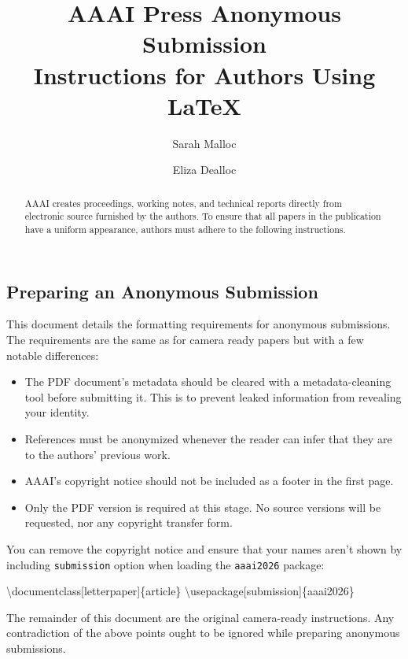\documentclass[letterpaper]{article} %
\title{AAAI Press Anonymous Submission\\
Instructions for Authors Using {\LaTeX}}
\author{Sarah Malloc \and Eliza Dealloc}
\date{}
\newenvironment{Shaded}{\begin{snugshade}}{\end{snugshade}}
\newcommand{\BuiltInTok}[1]{\textcolor[rgb]{0.00,0.23,0.31}{#1}}
\newcommand{\ExtensionTok}[1]{\textcolor[rgb]{0.00,0.23,0.31}{#1}}
\newcommand{\NormalTok}[1]{\textcolor[rgb]{0.00,0.23,0.31}{#1}}
\providecommand{\tightlist}{%
  \setlength{\itemsep}{0pt}\setlength{\parskip}{0pt}}
\begin{document}
\maketitle
\begin{abstract}
AAAI creates proceedings, working notes, and technical reports directly
from electronic source furnished by the authors. To ensure that all
papers in the publication have a uniform appearance, authors must adhere
to the following instructions.
\end{abstract}


\subsection{Preparing an Anonymous
Submission}\label{preparing-an-anonymous-submission}

This document details the formatting requirements for anonymous
submissions. The requirements are the same as for camera ready papers
but with a few notable differences:

\begin{itemize}
\tightlist
\item
  The PDF document's metadata should be cleared with a metadata-cleaning
  tool before submitting it. This is to prevent leaked information from
  revealing your identity.
\item
  References must be anonymized whenever the reader can infer that they
  are to the authors' previous work.
\item
  AAAI's copyright notice should not be included as a footer in the
  first page.
\item
  Only the PDF version is required at this stage. No source versions
  will be requested, nor any copyright transfer form.
\end{itemize}

You can remove the copyright notice and ensure that your names aren't
shown by including \texttt{submission} option when loading the
\texttt{aaai2026} package:

\begin{Shaded}
\begin{Highlighting}[]
\BuiltInTok{\textbackslash{}documentclass}\NormalTok{[letterpaper]\{}\ExtensionTok{article}\NormalTok{\}}
\BuiltInTok{\textbackslash{}usepackage}\NormalTok{[submission]\{}\ExtensionTok{aaai2026}\NormalTok{\}}
\end{Highlighting}
\end{Shaded}

The remainder of this document are the original camera-ready
instructions. Any contradiction of the above points ought to be ignored
while preparing anonymous submissions.
\end{document}
